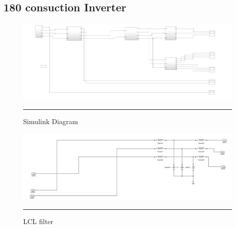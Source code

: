 \subsection{180 consuction Inverter}
\begin{figure}[htbp]
	\centering
	\includegraphics[width = 6in]{./Figures/180inverter.jpg}
	\rule{35em}{1pt}
	\caption{Simulink Diagram}
\end{figure}
\begin{figure}[htbp]
	\centering
	\includegraphics[width = 6in]{./Figures/LCL.jpg}
	\rule{35em}{1pt}
	\caption{LCL filter}
\end{figure}